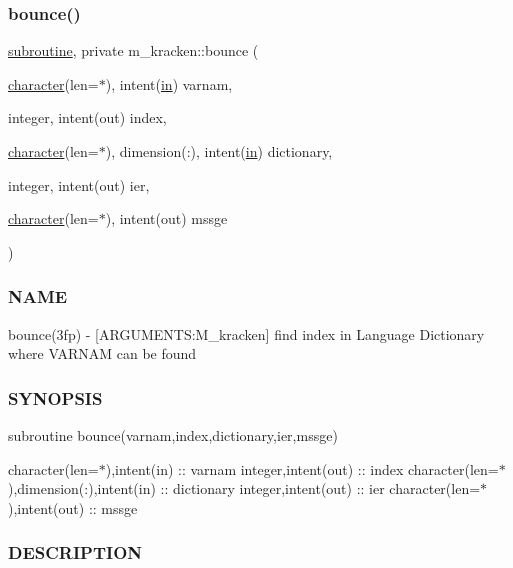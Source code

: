 \subsubsection{\texorpdfstring{bounce()}{bounce()}}
{\footnotesize\ttfamily \hyperlink{M__stopwatch_83_8txt_acfbcff50169d691ff02d4a123ed70482}{subroutine}, private m\+\_\+kracken\+::bounce (\begin{DoxyParamCaption}\item[{\hyperlink{option__stopwatch_83_8txt_abd4b21fbbd175834027b5224bfe97e66}{character}(len=$\ast$), intent(\hyperlink{M__journal_83_8txt_afce72651d1eed785a2132bee863b2f38}{in})}]{varnam,  }\item[{integer, intent(out)}]{index,  }\item[{\hyperlink{option__stopwatch_83_8txt_abd4b21fbbd175834027b5224bfe97e66}{character}(len=$\ast$), dimension(\+:), intent(\hyperlink{M__journal_83_8txt_afce72651d1eed785a2132bee863b2f38}{in})}]{dictionary,  }\item[{integer, intent(out)}]{ier,  }\item[{\hyperlink{option__stopwatch_83_8txt_abd4b21fbbd175834027b5224bfe97e66}{character}(len=$\ast$), intent(out)}]{mssge }\end{DoxyParamCaption})\hspace{0.3cm}{\ttfamily [private]}}



\subsubsection*{N\+A\+ME}

bounce(3fp) -\/ \mbox{[}A\+R\+G\+U\+M\+E\+N\+TS\+:M\+\_\+kracken\mbox{]} find index in Language Dictionary where V\+A\+R\+N\+AM can be found \subsubsection*{S\+Y\+N\+O\+P\+S\+IS}

subroutine bounce(varnam,index,dictionary,ier,mssge)

character(len=$\ast$),intent(in) \+:\+: varnam integer,intent(out) \+:\+: index character(len=$\ast$),dimension(\+:),intent(in) \+:\+: dictionary integer,intent(out) \+:\+: ier character(len=$\ast$),intent(out) \+:\+: mssge

\subsubsection*{D\+E\+S\+C\+R\+I\+P\+T\+I\+ON}

